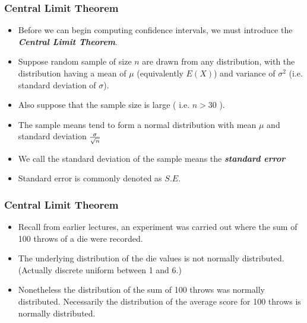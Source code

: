 \begin{frame}
\frametitle{Central Limit Theorem}

\begin{itemize}

\item Before we can begin computing confidence intervals, we must introduce the \textbf{\emph{Central Limit Theorem}}.

\item Suppose random sample of size $n$ are drawn from any distribution, with the distribution having a mean of $\mu$ (equivalently $E(X)$) and variance of $\sigma^2$ (i.e. standard deviation of $\sigma$).

\item Also suppose that the sample size is large ( i.e. $n > 30$ ).

\item The sample means tend to form a normal distribution with mean $\mu$ and standard deviation $ { \sigma \over \sqrt{n} }$

\item We call the standard deviation of the sample means the \textbf{\emph{standard error}}
\item Standard error is commonly denoted as $S.E.$
\end{itemize}
\end{frame}

\begin{frame}
\frametitle{Central Limit Theorem}

\begin{itemize}

\item Recall from earlier lectures, an experiment was carried out where the sum of 100 throws of a die were recorded.

\item The underlying distribution of the die values is not normally distributed. \\(Actually discrete uniform between 1 and 6.)

\item Nonetheless the distribution of the sum of 100 throws was normally distributed. Necessarily the distribution of the average score for 100 throws is normally distributed.

\end{itemize}
\end{frame}

